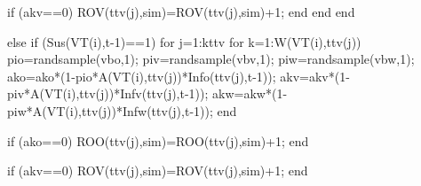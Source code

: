                                                          
                                                                                if (akv==0)
                                                                                        ROV(ttv(j),sim)=ROV(ttv(j),sim)+1;
                                                                                end
                                                                        end                                                       
                                                             end
                                              
                                          else 
                                                        if (Sus(VT(i),t-1)==1)
                                                                    for j=1:kttv                                                                                                  
                                                                            for k=1:W(VT(i),ttv(j))                                                    
                                                                                pio=randsample(vbo,1);
                                                                                piv=randsample(vbv,1);
                                                                                piw=randsample(vbw,1);
                                                                                ako=ako*(1-pio*A(VT(i),ttv(j))*Info(ttv(j),t-1));
                                                                                akv=akv*(1-piv*A(VT(i),ttv(j))*Infv(ttv(j),t-1));
                                                                                akw=akw*(1-piw*A(VT(i),ttv(j))*Infw(ttv(j),t-1));                                                                 
                                                                            end
                                                          
                                                                            if (ako==0)
                                                                                    ROO(ttv(j),sim)=ROO(ttv(j),sim)+1;
                                                                            end
                                                          
                                                                            if (akv==0)
                                                                                    ROV(ttv(j),sim)=ROV(ttv(j),sim)+1;
                                                                            end
                                                          
